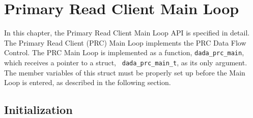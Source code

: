 \chapter{Primary Read Client Main Loop}
\label{app:dada_prc_main}

In this chapter, the Primary Read Client Main Loop API is specified in
detail.  The Primary Read Client (PRC) Main Loop implements the PRC
Data Flow Control.  The PRC Main Loop is implemented as a function,
{\tt dada\_prc\_main}, which receives a pointer to a struct, {\tt
dada\_prc\_main\_t}, as its only argument.  The member variables of
this struct must be properly set up before the Main Loop is entered,
as described in the following section.

\section{Initialization}

